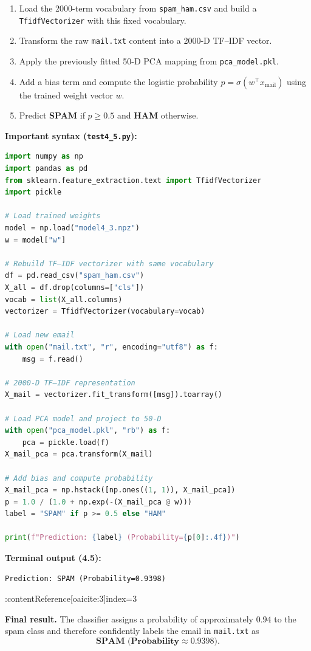 \documentclass[12pt]{article}
\begin{document}
\begin{enumerate}
  \item Load the 2000-term vocabulary from \texttt{spam\_ham.csv} and build a
        \texttt{TfidfVectorizer} with this fixed vocabulary.
  \item Transform the raw \texttt{mail.txt} content into a 2000-D TF--IDF
        vector.
  \item Apply the previously fitted 50-D PCA mapping from \texttt{pca\_model.pkl}.
  \item Add a bias term and compute the logistic probability
        $p = \sigma(w^\top x_{\text{mail}})$ using the trained weight vector
        $w$.
  \item Predict \textbf{SPAM} if $p \ge 0.5$ and \textbf{HAM} otherwise.
\end{enumerate}

\textbf{Important syntax (\texttt{test4\_5.py}):}
\begin{lstlisting}[language=Python]
import numpy as np
import pandas as pd
from sklearn.feature_extraction.text import TfidfVectorizer
import pickle

# Load trained weights
model = np.load("model4_3.npz")
w = model["w"]

# Rebuild TF–IDF vectorizer with same vocabulary
df = pd.read_csv("spam_ham.csv")
X_all = df.drop(columns=["cls"])
vocab = list(X_all.columns)
vectorizer = TfidfVectorizer(vocabulary=vocab)

# Load new email
with open("mail.txt", "r", encoding="utf8") as f:
    msg = f.read()

# 2000-D TF–IDF representation
X_mail = vectorizer.fit_transform([msg]).toarray()

# Load PCA model and project to 50-D
with open("pca_model.pkl", "rb") as f:
    pca = pickle.load(f)
X_mail_pca = pca.transform(X_mail)

# Add bias and compute probability
X_mail_pca = np.hstack([np.ones((1, 1)), X_mail_pca])
p = 1.0 / (1.0 + np.exp(-(X_mail_pca @ w)))
label = "SPAM" if p >= 0.5 else "HAM"

print(f"Prediction: {label} (Probability={p[0]:.4f})")
\end{lstlisting}

\textbf{Terminal output (4.5):}
\begin{lstlisting}
Prediction: SPAM (Probability=0.9398)
\end{lstlisting}
:contentReference[oaicite:3]{index=3}

\textbf{Final result.}
The classifier assigns a probability of approximately $0.94$ to the spam
class and therefore confidently labels the email in \texttt{mail.txt} as
\[
\boxed{\textbf{SPAM (Probability} \approx \mathbf{0.9398})}.
\]
\end{document}
